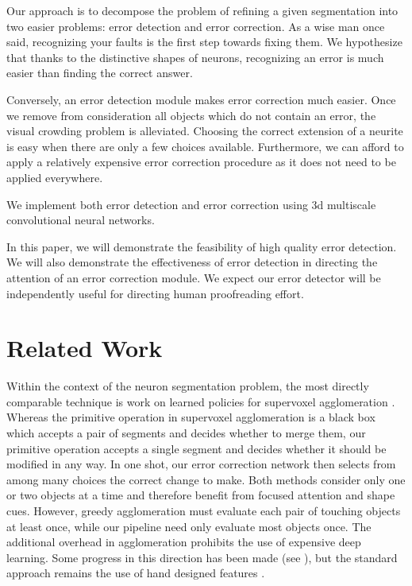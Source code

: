 \documentclass{article}
\begin{document}
Our approach is to decompose the problem of refining a given segmentation into two easier problems: error detection and error correction. As a wise man once said, recognizing your faults is the first step towards fixing them. We hypothesize that thanks to the distinctive shapes of neurons, recognizing an error is much easier than finding the correct answer. 

Conversely, an error detection module makes error correction much easier. Once we remove from consideration all objects which do not contain an error, the visual crowding problem is alleviated. Choosing the correct extension of a neurite is easy when there are only a few choices available. Furthermore, we can afford to apply a relatively expensive error correction procedure as it does not need to be applied everywhere.

We implement both error detection and error correction using 3d multiscale convolutional neural networks.

In this paper, we will demonstrate the feasibility of high quality error detection. We will also demonstrate the effectiveness of error detection in directing the attention of an error correction module. We expect our error detector will be independently useful for directing human proofreading effort.

\section{Related Work}
Within the context of the neuron segmentation problem, the most directly comparable technique is work on learned policies for supervoxel agglomeration \cite{lash,gala}. Whereas the primitive operation in supervoxel agglomeration is a black box which accepts a pair of segments and decides whether to merge them, our primitive operation accepts a single segment and decides whether it should be modified in any way. In one shot, our error correction network then selects from among many choices the correct change to make. Both methods consider only one or two objects at a time and therefore benefit from focused attention and shape cues. However, greedy agglomeration must evaluate each pair of touching objects at least once, while our pipeline need only evaluate most objects once. The additional overhead in agglomeration prohibits the use of expensive deep learning. Some progress in this direction has been made (see \cite{convnet_agglomeration}), but the standard approach remains the use of hand designed features \cite{gala}.
\end{document}
